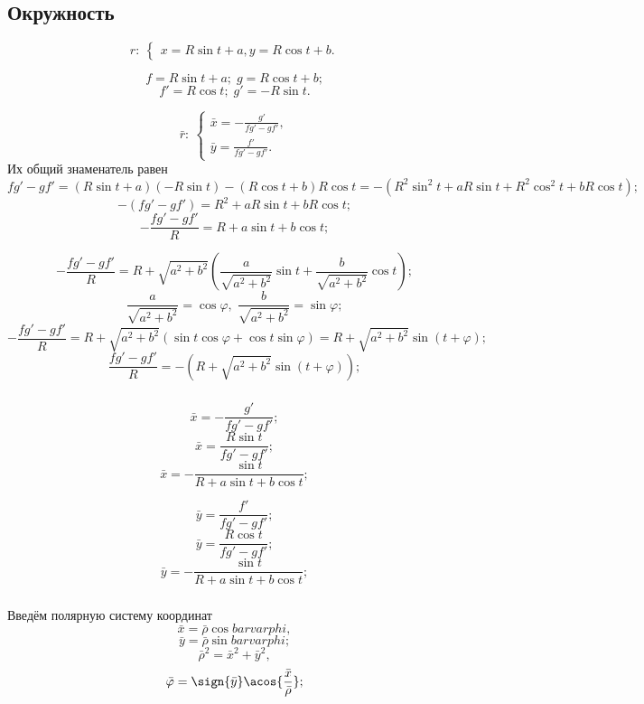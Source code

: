 \subsection{Окружность}
$$r: \: 
\left\{ \begin{gathered}
	x = R\sin{t}+a,
	y = R\cos{t}+b.
\end{gathered} \right.
$$

$$f = R\sin{t}+a; \; g = R\cos{t}+b;$$
$$f' = R\cos{t}; \; g' = -R\sin{t}.$$

$$\bar{r}:
\:
\left\{
\begin{gathered}
	\bar{x} =  -\frac{g'}{f g' - g f'},\\
	\bar{y} =  \frac{f'}{f g' - g f'}.
\end{gathered}
\right.
$$
Их общий знаменатель равен
$$f g' - g f' = (R\sin{t}+a)(-R\sin{t}) - (R\cos{t}+b) R\cos{t} = -\left(R^2\sin^2{t}+aR\sin{t} + R^2\cos^2{t} +bR\cos{t}\right);$$
$$-(f g' - g f') = R^2 + aR\sin{t} + bR\cos{t};$$
$$-\frac{f g' - g f'}{R} = R + a\sin{t} + b\cos{t};$$

$$-\frac{f g' - g f'}{R} = R + \sqrt{a^2+b^2}\left(\frac{a}{\sqrt{a^2+b^2}}\sin{t} + \frac{b}{\sqrt{a^2+b^2}}\cos{t}\right);$$
$$\frac{a}{\sqrt{a^2+b^2}} =\cos\varphi, \; \frac{b}{\sqrt{a^2+b^2}} = \sin\varphi;$$
$$-\frac{f g' - g f'}{R} = R + \sqrt{a^2+b^2}\left(\sin{t}\cos\varphi + \cos{t}\sin\varphi\right) = R + \sqrt{a^2+b^2}\sin{\left(t + \varphi \right)};$$
$$\frac{f g' - g f'}{R} = - \left( R + \sqrt{a^2+b^2}\sin{\left(t + \varphi \right)} \right);$$


\subparagraph{}
\begin{minipage}{0.4\textwidth}
$$\bar{x} =  -\frac{g'}{f g' - g f'};$$
$$\bar{x} =  \frac{R \sin{t}}{f g' - g f'};$$
$$\bar{x} =  -\frac{\sin{t}}{R + a\sin{t} + b\cos{t}};$$

\end{minipage}
\begin{minipage}{0.4\textwidth}
$$\bar{y} =  \frac{f'}{f g' - g f'};$$
$$\bar{y} =  \frac{R \cos{t}}{f g' - g f'};$$
$$\bar{y} =  -\frac{\sin{t}}{R + a\sin{t} + b\cos{t}};$$

\end{minipage}

\subparagraph{} Введём полярную систему координат
$$\bar{x} = \bar{\rho}\cos{bar{varphi}},$$
$$\bar{y} = \bar{\rho}\sin{bar{varphi}};$$
$$\bar{\rho}^2 = \bar{x}^2 + \bar{y}^2,$$
$$\bar{\varphi} = \sign{\bar{y}}\acos{\frac{\bar{x}}{\bar{\rho}}};$$